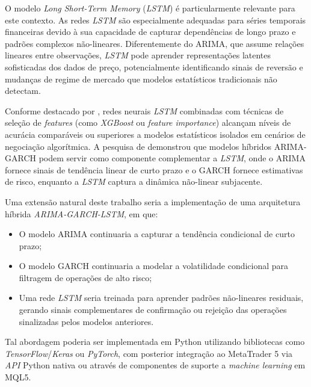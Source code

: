 \par

O modelo \textit{Long Short-Term Memory} (\textit{LSTM}) é particularmente relevante para este contexto. As redes \textit{LSTM} são especialmente adequadas para séries temporais financeiras devido à sua capacidade de capturar dependências de longo prazo e padrões complexos não-lineares. Diferentemente do ARIMA, que assume relações lineares entre observações, \textit{LSTM} pode aprender representações latentes sofisticadas dos dados de preço, potencialmente identificando sinais de reversão e mudanças de regime de mercado que modelos estatísticos tradicionais não detectam.

\par

Conforme destacado por , redes neurais \textit{LSTM} combinadas com técnicas de seleção de \textit{features} (como \textit{XGBoost} ou \textit{feature importance}) alcançam níveis de acurácia comparáveis ou superiores a modelos estatísticos isolados em cenários de negociação algorítmica. A pesquisa de  demonstrou que modelos híbridos ARIMA-GARCH podem servir como componente complementar a \textit{LSTM}, onde o ARIMA fornece sinais de tendência linear de curto prazo e o GARCH fornece estimativas de risco, enquanto a \textit{LSTM} captura a dinâmica não-linear subjacente.

\par

Uma extensão natural deste trabalho seria a implementação de uma arquitetura híbrida \textit{ARIMA-GARCH-LSTM}, em que:

\begin{itemize}
  \item O modelo ARIMA continuaria a capturar a tendência condicional de curto prazo;
  \item O modelo GARCH continuaria a modelar a volatilidade condicional para filtragem de operações de alto risco;
  \item Uma rede \textit{LSTM} seria treinada para aprender padrões não-lineares residuais, gerando sinais complementares de confirmação ou rejeição das operações sinalizadas pelos modelos anteriores.
\end{itemize}

\par

Tal abordagem poderia ser implementada em Python utilizando bibliotecas como \textit{TensorFlow}/\textit{Keras} ou \textit{PyTorch}, com posterior integração ao MetaTrader 5 via \textit{API} Python nativa ou através de componentes de suporte a \textit{machine learning} em MQL5.

